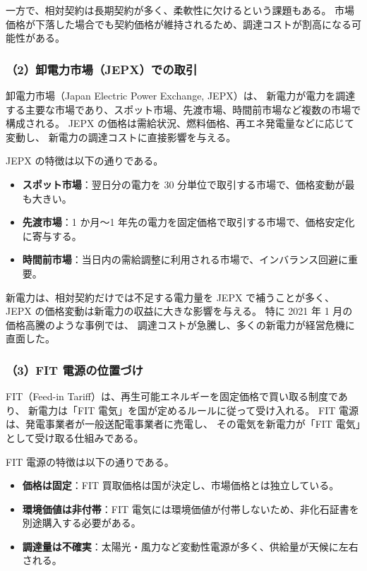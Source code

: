 一方で、相対契約は長期契約が多く、柔軟性に欠けるという課題もある。
市場価格が下落した場合でも契約価格が維持されるため、調達コストが割高になる可能性がある。

\subsubsection{（2）卸電力市場（JEPX）での取引}

卸電力市場（Japan Electric Power Exchange, JEPX）は、
新電力が電力を調達する主要な市場であり、スポット市場、先渡市場、時間前市場など複数の市場で構成される。
JEPX の価格は需給状況、燃料価格、再エネ発電量などに応じて変動し、
新電力の調達コストに直接影響を与える。

JEPX の特徴は以下の通りである。

\begin{itemize}
  \item \textbf{スポット市場}：翌日分の電力を 30 分単位で取引する市場で、価格変動が最も大きい。
  \item \textbf{先渡市場}：1 か月〜1 年先の電力を固定価格で取引する市場で、価格安定化に寄与する。
  \item \textbf{時間前市場}：当日内の需給調整に利用される市場で、インバランス回避に重要。
\end{itemize}

新電力は、相対契約だけでは不足する電力量を JEPX で補うことが多く、
JEPX の価格変動は新電力の収益に大きな影響を与える。
特に 2021 年 1 月の価格高騰のような事例では、
調達コストが急騰し、多くの新電力が経営危機に直面した。

\subsubsection{（3）FIT 電源の位置づけ}

FIT（Feed-in Tariff）は、再生可能エネルギーを固定価格で買い取る制度であり、
新電力は「FIT 電気」を国が定めるルールに従って受け入れる。
FIT 電源は、発電事業者が一般送配電事業者に売電し、
その電気を新電力が「FIT 電気」として受け取る仕組みである。

FIT 電源の特徴は以下の通りである。

\begin{itemize}
  \item \textbf{価格は固定}：FIT 買取価格は国が決定し、市場価格とは独立している。
  \item \textbf{環境価値は非付帯}：FIT 電気には環境価値が付帯しないため、非化石証書を別途購入する必要がある。
  \item \textbf{調達量は不確実}：太陽光・風力など変動性電源が多く、供給量が天候に左右される。
\end{itemize}

